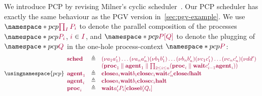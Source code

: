 \documentclass[main.tex]{subfiles}
\begin{document}


\begin{example}\label{sec:pcp-example}
We introduce PCP by revising Milner's cyclic scheduler~\cite{milner89,dardhagay18}. Our PCP scheduler has exactly the same behaviour as the PGV version in~\cref{sec:pgv-example}. We use $\pcp{\tm{\prod_{I}P_i}}$ to denote the parallel composition of the processes $\pcp{\tm{P_i}}$, $\tm{i}\in\tm{I}$, and $\pcp{\tm{\plug{P}{Q}}}$ to denote the plugging of $\pcp{\tm{Q}}$ in the one-hole process-context $\pcp{\tm{P}}$:
\[
  \usingnamespace{pcp}
  \begin{array}{lrlr}
    \tm{\sched}
    & \defeq & \tm{\res{a_1}{a'_1}{\dots{\res{a_n}{a'_n}{}}}}
               \tm{\res{b_1}{b'_1}{\dots{\res{b_n}{b'_n}{}}}}
               \tm{\res{c_1}{c'_1}{\dots{\res{c_n}{c'_n}{}}}}
               \tm{\res{d}{d'}{}}
    \\ &     & \tm{(
               \ppar{\proc1}{\agent1}
               \parallel
               \prod_{2\leq{i}\leq{n}}(\ppar{\proc{i}}{\wait{c'_{i-1}}{\agent{i}}})
               )}
    \\
    \tm{\agent1}
    & \defeq & \tm{\close{a_i}{\wait{b_i}{\close{c_i}{\wait{c'_n}{\close{d}{\halt}}}}}}
    \\
    \tm{\agent{i}}
    & \defeq & \tm{\close{a_i}{\wait{b_i}{\close{c_i}{\halt}}}}
    \\
    \tm{\proc{i}}
    & \defeq & \tm{\wait{a'_i}{\plug{P_i}{\close{b'_i}{Q_i}}}}
  \end{array}
\]
\end{example}
\end{document}

